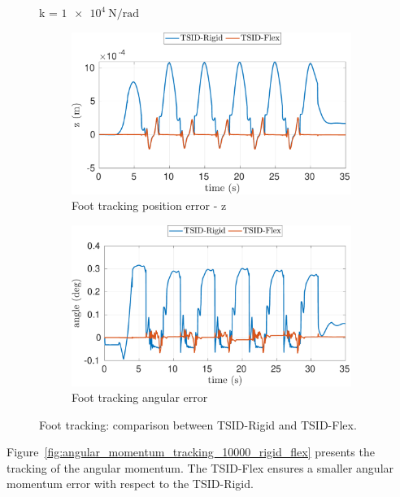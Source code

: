 \begin{figure}[!t]
    \begin{myframe}{k = $\SI{1e4}{\newton \per \radian}$}
    \centering
        \begin{subfigure}[b]{0.49\textwidth}
        \centering
        \includegraphics[width=\columnwidth]{chapter_flexible_joints/figures/comparison_10000_left_foot_position_error_z.pdf}
        \caption{Foot tracking position error - z}
    \end{subfigure}
    \hfill
    \begin{subfigure}[b]{0.49\textwidth}
        \centering
        \includegraphics[width=\columnwidth]{chapter_flexible_joints/figures/comparison_10000_left_foot_angle_rot_error.pdf}
        \caption{Foot tracking angular error}
    \end{subfigure}
    \end{myframe}
    \caption{Foot tracking: comparison between TSID-Rigid and TSID-Flex.\label{fig:foot_error_10000_rigid_flex}}
\end{figure}
Figure~\ref{fig:angular_momentum_tracking_10000_rigid_flex} presents the tracking of the angular momentum. The TSID-Flex ensures a smaller angular momentum error with respect to the TSID-Rigid. 
